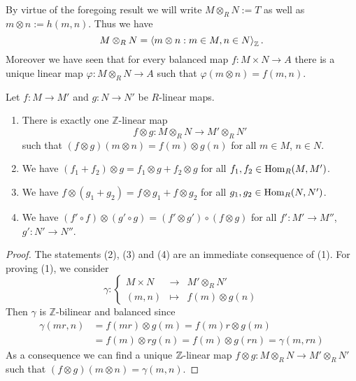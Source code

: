 
By virtue of the foregoing result we will write $M \otimes_R N := T$ as well as $m \otimes n := h(m,n)$. Thus we have
\[
M \otimes_R N = \left\langle m \otimes n : m \in M, n \in N \right\rangle_{\mathbb{Z}}.
\]
Moreover we have seen that for every balanced map $f : M \times N \to A$ there is a unique linear map $\varphi : M \otimes_R N
\to A$ such that $\varphi(m \otimes n)  =f(m,n)$.


\begin{lemma}\label{3.3.5}
Let $f: M \to M'$ and $g : N \to N'$ be $R$-linear maps.
\begin{enumerate}
  \item There is exactly one $\mathbb{Z}$-linear map \[f \otimes g : M \otimes_R N \to M' \otimes_R N'\] such
    that $(f \otimes g)(m \otimes n) = f(m) \otimes g(n)$ for all $m \in M$, $n \in N$.
  \item We have $(f_1 + f_2)\otimes g = f_1 \otimes g + f_2 \otimes g$ for all $f_1, f_2 \in \operatorname{Hom}_R(M,M')$.
  \item We have $f\otimes(g_1 + g_2)=  f \otimes g_1 + f \otimes g_2$ for all $g_1, g_2 \in \operatorname{Hom}_R(N,N')$.
  \item We have $(f' \circ f)\otimes(g' \circ g) = (f'\otimes g')\circ(f\otimes g)$ for all $f': M' \to M''$, $g': N' \to N''$.
\end{enumerate}
\end{lemma}


\begin{proof}
The statements (2), (3) and (4) are an immediate consequence of (1). For proving (1), we consider
\[
\gamma :
\left\{
\begin{matrix}
M \times N & \to &  M' \otimes_R N'\\
(m,n) &\mapsto & f(m) \otimes g(n)
\end{matrix}
\right.
\]
Then $\gamma$ is $\mathbb{Z}$-bilinear and balanced since
\begin{align*}
\gamma(mr, n)
  & = f(mr) \otimes g(m) = f(m)r \otimes g(m) \\
  & = f(m) \otimes rg(n) = f(m) \otimes g(rn) = \gamma(m,rn)
\end{align*}
%
As a consequence we can find a unique $\mathbb{Z}$-linear map $f \otimes g : M \otimes_R N \to M' \otimes_R N'$ such that $(f \otimes g)(m \otimes n)=\gamma(m,n)$.
\end{proof}

